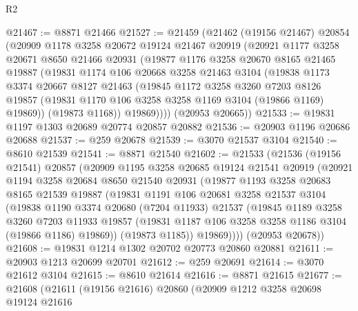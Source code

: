 \begin{lexlean}{R2}
\begin{coremodule}
@21467 := @8871 @21466
@21527 := @21459
    (@21462
      (@19156 @21467)
      @20854
      (@20909
        @1178
        @3258
        @20672
        @19124
        @21467
        @20919
        (@20921
          @1177
          @3258
          @20671
          @8650
          @21466
          @20931
          (@19877
            @1176
            @3258
            @20670
            @8165
            @21465
            @19887
            (@19831
              @1174
              @106
              @20668
              @3258
              @21463
              @3104
              (@19838
                @1173
                @3374
                @20667
                @8127
                @21463
                (@19845
                  @1172
                  @3258
                  @3260
                  @7203
                  @8126
                  @19857
                  (@19831 @1170 @106 @3258 @3258 @1169 @3104 (@19866 @1169) @19869))
                (@19873 @1168))
              @19869))))
      (@20953 @20665))
@21533 := @19831 @1197 @1303 @20689 @20774 @20857 @20882
@21536 := @20903 @1196 @20686 @20688
@21537 := @259 @20678
@21539 := @3070 @21537 @3104
@21540 := @8610 @21539
@21541 := @8871 @21540
@21602 := @21533
    (@21536
      (@19156 @21541)
      @20857
      (@20909
        @1195
        @3258
        @20685
        @19124
        @21541
        @20919
        (@20921
          @1194
          @3258
          @20684
          @8650
          @21540
          @20931
          (@19877
            @1193
            @3258
            @20683
            @8165
            @21539
            @19887
            (@19831
              @1191
              @106
              @20681
              @3258
              @21537
              @3104
              (@19838
                @1190
                @3374
                @20680
                (@7204 @11933)
                @21537
                (@19845
                  @1189
                  @3258
                  @3260
                  @7203
                  @11933
                  @19857
                  (@19831 @1187 @106 @3258 @3258 @1186 @3104 (@19866 @1186) @19869))
                (@19873 @1185))
              @19869))))
      (@20953 @20678))
@21608 := @19831 @1214 @1302 @20702 @20773 @20860 @20881
@21611 := @20903 @1213 @20699 @20701
@21612 := @259 @20691
@21614 := @3070 @21612 @3104
@21615 := @8610 @21614
@21616 := @8871 @21615
@21677 := @21608
    (@21611
      (@19156 @21616)
      @20860
      (@20909
        @1212
        @3258
        @20698
        @19124
        @21616

\end{coremodule}
\end{lexlean}
